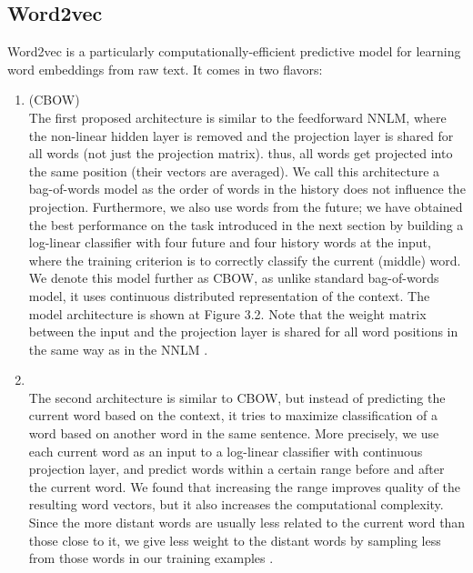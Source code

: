 \subsection{Word2vec}
  Word2vec is a particularly computationally-efficient predictive model for learning word embeddings from raw text. It comes in two flavors:
  \begin{enumerate}
      \item\textcite{ Continuous Bag-of-Words model}(CBOW)\\
            The first proposed architecture is similar to the feedforward NNLM, where the non-linear hidden layer is removed and the projection layer is shared for all words (not just the projection matrix). thus, all words get projected into the
            same position (their vectors are averaged). We call this architecture a bag-of-words model as the order of words in the history does not influence the projection. Furthermore, we also use words from the future; we have obtained the best performance on the task introduced in the next section by building a log-linear classifier with four future and four history words at the input, where the training criterion is to correctly classify the current (middle) word.
            We denote this model further as CBOW, as unlike standard bag-of-words model, it uses continuous distributed representation of the context. The model architecture is shown at Figure 3.2. Note that the weight matrix between the input and the projection layer is shared for all word positions in the same way as in the NNLM \cite{DBLP:journals/corr/abs-1301-3781}.
  
     \item\textcite{Skip-Gram model}\\
            The second architecture is similar to CBOW, but instead of predicting the current word based on the context, it tries to maximize classification of a word based on another word in the same sentence. More precisely, we use each current word as an input to a log-linear classifier with continuous projection layer, and predict words within a certain range before and after the current word. We found that increasing the range improves quality of the resulting word vectors, but it also increases the computational complexity. Since the more distant words are usually less related to the current word than those close to it, we give less weight to the distant words by sampling less from those words in our training examples \cite{DBLP:journals/corr/abs-1301-3781}.
  \end{enumerate}
  
